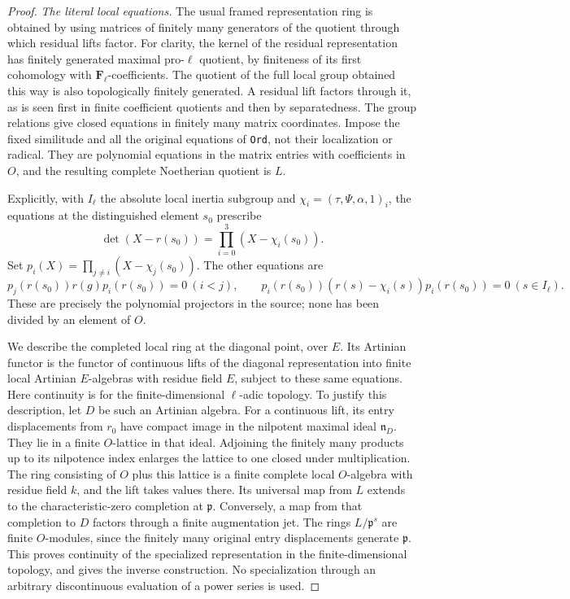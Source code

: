 \begin{proof}
\emph{The literal local equations.}
The usual framed representation ring is obtained by using matrices
of finitely many generators of the quotient through which residual
lifts factor. For clarity, the kernel of the residual representation
has finitely generated maximal pro-\(\ell\) quotient, by finiteness
of its first cohomology with \(\mathbf F_\ell\)-coefficients.
The quotient of the full local group obtained this way is also
topologically finitely generated. A residual lift factors through it,
as is seen first in finite coefficient quotients and then by
separatedness. The group relations give closed equations in finitely
many matrix coordinates. Impose the fixed similitude and all the
original equations of \texttt{Ord}, not their localization or
radical. They are polynomial equations in the matrix entries
with coefficients in \(O\), and the resulting complete
Noetherian quotient is \(L\).

Explicitly, with \(I_\ell\) the absolute local inertia subgroup
and \(\chi_i=(\tau,\Psi,\alpha,1)_i\), the equations at the
distinguished element \(s_0\) prescribe
\[
 \det(X-r(s_0))=\prod_{i=0}^3(X-\chi_i(s_0)).
\]
Set \(p_i(X)=\prod_{j\ne i}(X-\chi_j(s_0))\). The other equations
are
\[
 p_j(r(s_0))r(g)p_i(r(s_0))=0\ (i<j),\qquad
 p_i(r(s_0))(r(s)-\chi_i(s))p_i(r(s_0))=0\ (s\in I_\ell).
                                                               \tag{SM4}
\]
These are precisely the polynomial projectors in the source;
none has been divided by an element of \(O\).

We describe the completed local ring at the diagonal point,
over \(E\). Its Artinian functor is the functor of continuous
lifts of the diagonal representation into finite local
Artinian \(E\)-algebras with residue field \(E\), subject
to these same equations. Here continuity is for the
finite-dimensional \(\ell\)-adic topology. To justify this
description, let \(D\) be such an Artinian algebra.
For a continuous lift, its entry displacements from \(r_0\)
have compact image in the nilpotent maximal ideal \(\mathfrak n_D\).
They lie in a finite \(O\)-lattice in that ideal. Adjoining
the finitely many products up to its nilpotence index enlarges
the lattice to one closed under multiplication. The ring
consisting of \(O\) plus this lattice is a finite complete
local \(O\)-algebra with residue field \(k\), and the lift
takes values there. Its universal map from \(L\) extends
to the characteristic-zero completion at \(\mathfrak p\).
Conversely, a map from that completion to \(D\) factors
through a finite augmentation jet. The rings \(L/\mathfrak p^s\)
are finite \(O\)-modules, since the finitely many original
entry displacements generate \(\mathfrak p\). This proves
continuity of the specialized representation in the
finite-dimensional topology, and gives the inverse
construction. No specialization through an arbitrary
discontinuous evaluation of a power series is used.


\end{proof}
